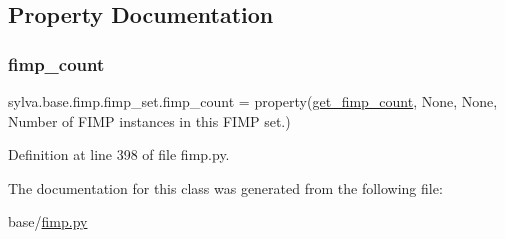 \subsection{Property Documentation}
\mbox{\label{classsylva_1_1base_1_1fimp_1_1fimp__set_a461b48d72f7fa42991d59c8ea4fd5593}} 
\subsubsection{\texorpdfstring{fimp\+\_\+count}{fimp\_count}}
{\footnotesize\ttfamily sylva.\+base.\+fimp.\+fimp\+\_\+set.\+fimp\+\_\+count = property(\hyperlink{classsylva_1_1base_1_1fimp_1_1fimp__set_aec3d350eabf8a4f0b7e478c4e27caf53}{get\+\_\+fimp\+\_\+count}, None, None, \textquotesingle{}Number of F\+I\+MP instances in this F\+I\+MP set.\textquotesingle{})\hspace{0.3cm}{\ttfamily [static]}}



Definition at line 398 of file fimp.\+py.



The documentation for this class was generated from the following file\+:\begin{DoxyCompactItemize}
\item 
base/\hyperlink{fimp_8py}{fimp.\+py}\end{DoxyCompactItemize}

